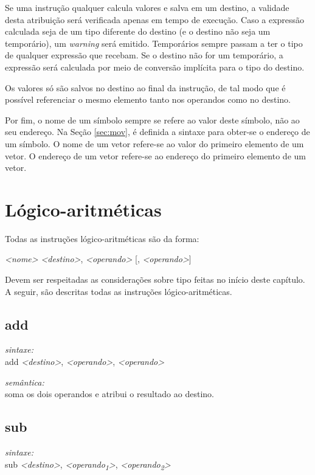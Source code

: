 \documentclass[12pt,a4paper,extrafontsizes,article]{memoir}
\newcommand*{\srcfont}{\fontfamily{pcr}\selectfont}
\begin{document}
Se uma instrução qualquer calcula valores e salva em um destino, a validade desta atribuição será verificada apenas em
tempo de execução. Caso a expressão calculada seja de um tipo diferente do destino (e o destino não seja um temporário),
um \textit{warning} será emitido. Temporários sempre passam a ter o tipo de qualquer expressão que recebam. Se o
destino não for um temporário, a expressão será calculada por meio de conversão implícita para o tipo do destino.

Os valores só são salvos no destino ao final da instrução, de tal modo que é possível referenciar o mesmo elemento tanto
nos operandos como no destino.

Por fim, o nome de um símbolo sempre se refere ao valor deste símbolo, não ao seu endereço. Na Seção \ref{sec:mov}, é
definida a sintaxe para obter-se o endereço de um símbolo. O nome de um vetor refere-se ao valor do primeiro elemento de
um vetor. O endereço de um vetor refere-se ao endereço do primeiro elemento de um vetor.

\section{Lógico-aritméticas}

Todas as instruções lógico-aritméticas são da forma:

\bigskip
{\srcfont\scriptsize \textit{<nome>} \textit{<destino>}, \textit{<operando>} [, \textit{<operando>}]}
\bigskip

Devem ser respeitadas as considerações sobre tipo feitas no início deste capítulo. A seguir, são descritas todas as
instruções lógico-aritméticas.


\subsection{\textbf{add}}

\textit{sintaxe:}\\{\srcfont add \textit{<destino>}, \textit{<operando>}, \textit{<operando>}}

\noindent \textit{semântica:}\\soma os dois operandos e atribui o resultado ao destino.


\subsection{\textbf{sub}}

\textit{sintaxe:}\\{\srcfont sub \textit{<destino>}, \textit{<operando\textsubscript{1}>},
\textit{<operando\textsubscript{2}>}}
\end{document}

